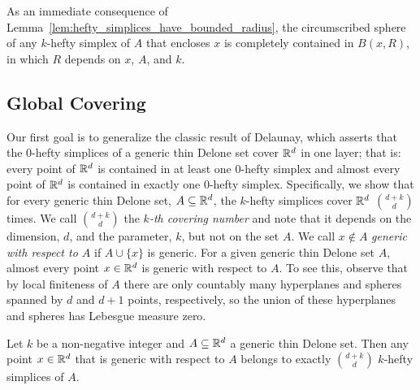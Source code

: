 \documentclass[a4paper,UKenglish,cleveref, autoref,numberwithinsect]{socg-lipics-v2021}
\newcommand {\mm}[1] {\ifmmode{#1}\else{\mbox{\(#1\)}}\fi}
\theoremstyle{plain}
\newcommand{\Rspace}        {\mm{{\mathbb R}}}
\begin{document}
As an immediate consequence of Lemma~\ref{lem:hefty_simplices_have_bounded_radius}, the circumscribed sphere of any $k$-hefty simplex of $A$ that encloses $x$ is completely contained in $B(x,R)$, in which $R$ depends on $x$, $A$, and $k$.
\subsection{Global Covering}
\label{sec:2.2}
Our first goal is to generalize the classic result of Delaunay, which asserts that the $0$-hefty simplices of a generic thin Delone set cover $\Rspace^d$ in one layer; that is: every point of $\Rspace^d$ is contained in at least one $0$-hefty simplex and almost every point of $\Rspace^d$ is contained in exactly one $0$-hefty simplex.
Specifically, we show that for every generic thin Delone set, $A \subseteq \Rspace^d$, the $k$-hefty simplices cover $\Rspace^d$ $\binom{d+k}{d}$ times.
We call $\binom{d+k}{d}$ the \emph{$k$-th covering number} and note that it depends on the dimension, $d$, and the parameter, $k$, but not on the set $A$.
We call $x \notin A$ \emph{generic with respect to $A$} if $A \cup \{x\}$ is generic.
For a given generic thin Delone set $A$, almost every point $x \in \Rspace^d$ is generic with respect to $A$.
To see this, observe that by local finiteness of $A$ there are only countably many hyperplanes and spheres spanned by $d$ and $d+1$ points, respectively, so the union of these hyperplanes and spheres has Lebesgue measure zero.
\begin{theorem}
  \label{thm:global_covering}
  Let $k$ be a non-negative integer and $A \subseteq \Rspace^d$ a generic thin Delone set.
  Then any point $x \in \Rspace^d$ that is generic with respect to $A$ belongs to exactly $\binom{d+k}{d}$ $k$-hefty simplices of $A$.
\end{theorem}
\end{document}
